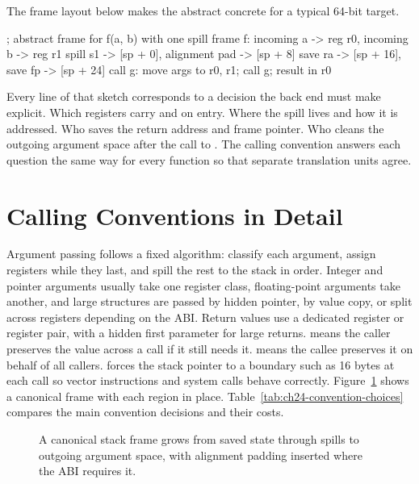 The frame layout below makes the abstract concrete for a typical 64-bit target.
\begin{irlisting}
; abstract frame for f(a, b) with one spill
frame f:
  incoming a -> reg r0, incoming b -> reg r1
  spill s1 -> [sp + 0], alignment pad -> [sp + 8]
  save ra -> [sp + 16], save fp -> [sp + 24]
  call g: move args to r0, r1; call g; result in r0
\end{irlisting}
Every line of that sketch corresponds to a decision the back end must make explicit.
Which registers carry  and  on entry.
Where the spill lives and how it is addressed.
Who saves the return address and frame pointer.
Who cleans the outgoing argument space after the call to .
The calling convention answers each question the same way for every function so that separate translation units agree.

\section{Calling Conventions in Detail}\label{sec:ch24-conventions}

Argument passing follows a fixed algorithm: classify each argument, assign registers while they last, and spill the rest to the stack in order.
Integer and pointer arguments usually take one register class, floating-point arguments take another, and large structures are passed by hidden pointer, by value copy, or split across registers depending on the ABI.
Return values use a dedicated register or register pair, with a hidden first parameter for large returns.
 means the caller preserves the value across a call if it still needs it.
 means the callee preserves it on behalf of all callers.
 forces the stack pointer to a boundary such as 16 bytes at each call so vector instructions and system calls behave correctly.
Figure~\ref{fig:ch24-frame} shows a canonical frame with each region in place.
Table~\ref{tab:ch24-convention-choices} compares the main convention decisions and their costs.

\begin{figure}[htbp]
\centering
{}
\caption{A canonical stack frame grows from saved state through spills to outgoing argument space, with alignment padding inserted where the ABI requires it.}
\label{fig:ch24-frame}
\end{figure}

